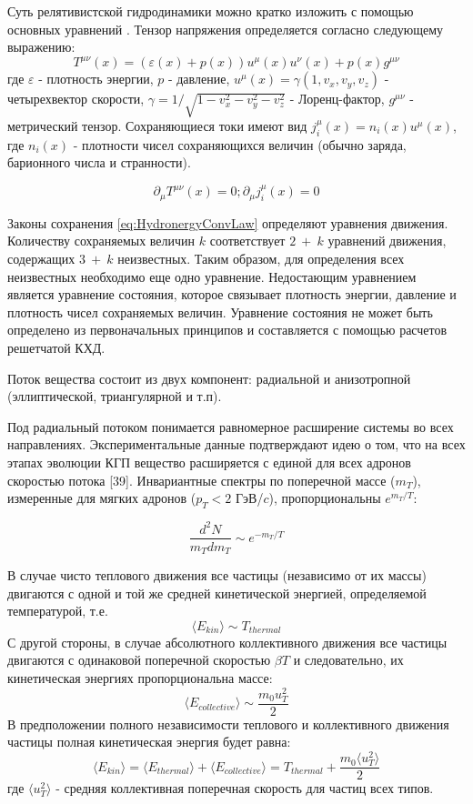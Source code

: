 Суть релятивистской гидродинамики можно кратко изложить с помощью основных уравнений \cite{Flow1}. Тензор напряжения определяется согласно следующему выражению:
\begin{equation}
	T^{\mu \nu}(x) = (\varepsilon(x)+p(x))u^{\mu}(x)u^{\nu}(x)+p(x)g^{\mu \nu}
	\label{eq:StressEnergyTensor}
\end{equation}
где $\varepsilon$ - плотность энергии, $p$ - давление, $u^{\mu}(x) = \gamma(1, v_x, v_y, v_z)$ - четырехвектор скорости, $\gamma = 1/ \sqrt{1 - v_x^2 - v_y^2 - v_z^2}$ - Лоренц-фактор, $g^{\mu \nu}$ - метрический тензор. Сохраняющиеся токи имеют вид $j_i^{\mu}(x) = n_i(x)u^{\mu}(x)$, где $n_i(x)$ - плотности чисел сохраняющихся величин (обычно заряда, барионного числа и странности). 

\begin{equation}
	\partial_{\mu}T^{\mu \nu}(x) = 0; \partial_{\mu}j^{\mu}_i(x) = 0
	\label{eq:HydronergyConvLaw}
\end{equation}

Законы сохранения \ref{eq:HydronergyConvLaw} определяют уравнения движения.  Количеству сохраняемых величин $k$ соответствует $2~+~k$ уравнений движения, содержащих $3~+~k$ неизвестных. Таким образом, для определения всех неизвестных необходимо еще одно уравнение. Недостающим уравнением является уравнение состояния, которое связывает плотность энергии, давление и плотность чисел сохраняемых величин. 
Уравнение состояния не может быть определено из первоначальных принципов и составляется с помощью расчетов решетчатой КХД. 

Поток вещества состоит из двух компонент: радиальной и анизотропной (эллиптической, триангулярной и т.п).

Под радиальный потоком понимается равномерное расширение системы во всех направлениях. Экспериментальные данные подтверждают идею о том, 
что на всех этапах эволюции КГП вещество расширяется с единой для всех адронов скоростью потока [39]. Инвариантные спектры по поперечной массе ($m_T$), измеренные для мягких адронов ($p_T<2$ ГэВ/$c$), пропорциональны $e^{m_T/T}$:

\begin{equation}
	\frac{d^2N}{m_Tdm_T} \sim e^{-m_T/T}
	\label{eq:InvSlopeRon}
\end{equation}

В случае чисто теплового движения все частицы (независимо от их массы) двигаются с одной и той же средней кинетической энергией, определяемой температурой, т.е.
$$\langle E_{kin} \rangle \sim T_{thermal}$$
С другой стороны, в случае абсолютного коллективного движения все частицы двигаются с одинаковой поперечной скоростью $\beta{T}$ и следовательно, их кинетическая энергиях пропорциональна массе:
$$\langle E_{collective} \rangle \sim \frac{m_0 u_T ^2}{2} $$
В предположении полного независимости теплового и коллективного движения частицы полная кинетическая энергия будет равна:
$$ \langle E_{kin} \rangle = \langle E_{thermal} \rangle + \langle E_{collective} \rangle = T_{thermal}+\frac{m_0 \langle u_T ^2 \rangle }{2}$$
где $ \langle u_T ^2 \rangle$ - средняя коллективная поперечная скорость для частиц всех типов. 

